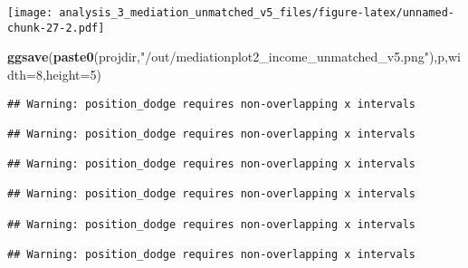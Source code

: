\documentclass[
]{article}
\newenvironment{Shaded}{\begin{snugshade}}{\end{snugshade}}
\newcommand{\DataTypeTok}[1]{\textcolor[rgb]{0.13,0.29,0.53}{#1}}
\newcommand{\DecValTok}[1]{\textcolor[rgb]{0.00,0.00,0.81}{#1}}
\newcommand{\KeywordTok}[1]{\textcolor[rgb]{0.13,0.29,0.53}{\textbf{#1}}}
\newcommand{\NormalTok}[1]{#1}
\newcommand{\StringTok}[1]{\textcolor[rgb]{0.31,0.60,0.02}{#1}}
\begin{document}
\texttt{[image: analysis\_3\_mediation\_unmatched\_v5\_files/figure-latex/unnamed-chunk-27-2.pdf]}

\begin{Shaded}
\begin{Highlighting}[]
\KeywordTok{ggsave}\NormalTok{(}\KeywordTok{paste0}\NormalTok{(projdir,}\StringTok{"/out/mediationplot2_income_unmatched_v5.png"}\NormalTok{),p,}\DataTypeTok{width=}\DecValTok{8}\NormalTok{,}\DataTypeTok{height=}\DecValTok{5}\NormalTok{)}
\end{Highlighting}
\end{Shaded}

\begin{verbatim}
## Warning: position_dodge requires non-overlapping x intervals

## Warning: position_dodge requires non-overlapping x intervals

## Warning: position_dodge requires non-overlapping x intervals

## Warning: position_dodge requires non-overlapping x intervals

## Warning: position_dodge requires non-overlapping x intervals

## Warning: position_dodge requires non-overlapping x intervals
\end{verbatim}
\end{document}
